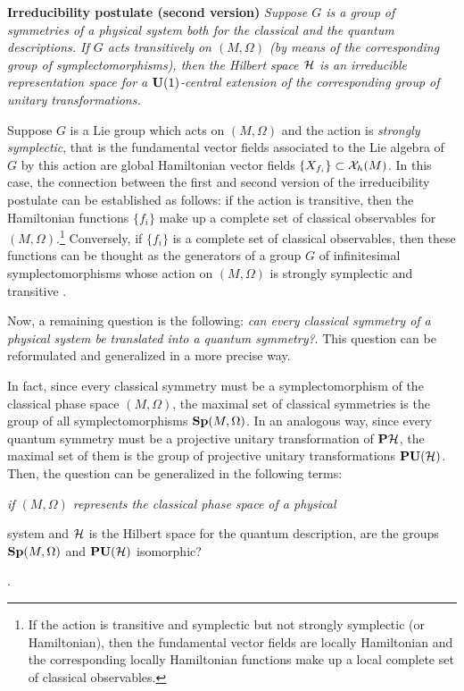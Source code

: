 \documentclass[12pt]{article}
\theoremstyle{plain}
\def\H{{\cal H}}
\begin{document}
\noindent
{\bf Irreducibility postulate (second version)}
{\it Suppose $G$ is a group of symmetries of a physical system
both for the classical and the quantum descriptions.
If $G$ acts transitively on $(M, \Omega )$
(by means of the corresponding group of symplectomorphisms),
then the Hilbert space $\H$ is an irreducible representation space
for a ${\bf U}(1)$-central extension of the corresponding
group of unitary transformations.
}

Suppose $G$ is a Lie group which acts on $(M,\Omega )$
and the action is {\it strongly symplectic},
that is the fundamental vector fields associated
to the Lie algebra of $G$ by this action are
global Hamiltonian vector fields $\{ X_{f_i} \} \subset {\cal X}_h(M)$.
In this case, the connection between the first and second version
of the irreducibility postulate can be established as follows:
if the action is transitive, then the Hamiltonian functions $\{ f_i \}$
make up a
complete set of classical observables for $(M,\Omega )$.\footnote{
If the action is transitive and symplectic but not strongly symplectic
(or Hamiltonian),
then the fundamental vector fields are locally Hamiltonian
and the corresponding locally Hamiltonian functions
make up a local complete set of classical observables.
}
Conversely, if $\{ f_i \}$ is a complete set of classical observables,
then these functions can be thought as the generators of a
group $G$ of infinitesimal symplectomorphisms
whose action on $(M,\Omega )$ is strongly symplectic and
transitive \cite{Ki-gq}.

Now, a remaining question is the following:
{\it can every classical symmetry of a physical system
be translated into a quantum symmetry?}.
This question can be reformulated and generalized in a more precise way.

In fact, since every classical symmetry must be
a symplectomorphism of the classical phase space $(M,\Omega )$,
the maximal set of classical symmetries is
the group of all symplectomorphisms ${\bf Sp}(M,\Omega )$.
In an analogous way, since every quantum symmetry must be
a projective unitary transformation of ${\bf P}\H$,
the maximal set of them is the group of projective unitary
transformations ${\bf PU}(\H )$.
Then, the question can be generalized in the following terms:
{\it if $(M,\Omega )$ represents the classical phase space of a physical

system
and $\H$ is the Hilbert space for the quantum description,
are the groups ${\bf Sp}(M,\Omega )$ and ${\bf PU}(\H )$ isomorphic?}.
\end{document}
